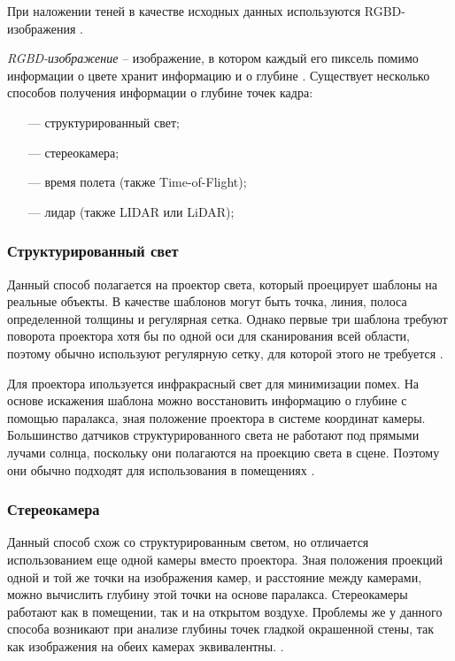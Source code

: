 При наложении теней в качестве исходных данных используются RGBD-изображения \cite{debevec2008rendering} \cite{sns_tras}.

\textit{RGBD-изображение} -- изображение, в котором каждый его пиксель помимо информации о цвете хранит информацию и о глубине \cite{rgbd}. Существует несколько способов получения информации о глубине точек кадра:

\begin{itemize}
	\item[---] структурированный свет;
	\item[---] стереокамера;
	\item[---] время полета (также Time-of-Flight);
	\item[---] лидар (также LIDAR или LiDAR);
\end{itemize}

\subsubsection*{Структурированный свет}

Данный способ полагается на проектор света, который проецирует шаблоны на реальные объекты. В качестве шаблонов могут быть точка, линия, полоса определенной толщины и регулярная сетка. Однако первые три шаблона требуют поворота проектора хотя бы по одной оси для сканирования всей области, поэтому обычно используют регулярную сетку, для которой этого не требуется \cite{struct_light}. 

Для проектора ипользуется инфракрасный свет для минимизации помех. На основе искажения шаблона можно восстановить информацию о глубине с помощью паралакса, зная положение проектора в системе координат камеры. Большинство датчиков структурированного света не работают под прямыми лучами солнца, поскольку они полагаются на проекцию света в сцене. Поэтому они обычно подходят для использования в помещениях \cite{struct_light}.

\subsubsection*{Стереокамера}

Данный способ схож со структурированным светом, но отличается использованием еще одной камеры вместо проектора. Зная положения проекций одной и той же точки на изображения камер, и расстояние между камерами, можно вычислить глубину этой точки на основе паралакса. Стереокамеры работают как в помещении, так и на открытом воздухе. Проблемы же у данного способа возникают при анализе глубины точек гладкой окрашенной стены, так как изображения на обеих камерах эквивалентны. \cite{rgbd}.

